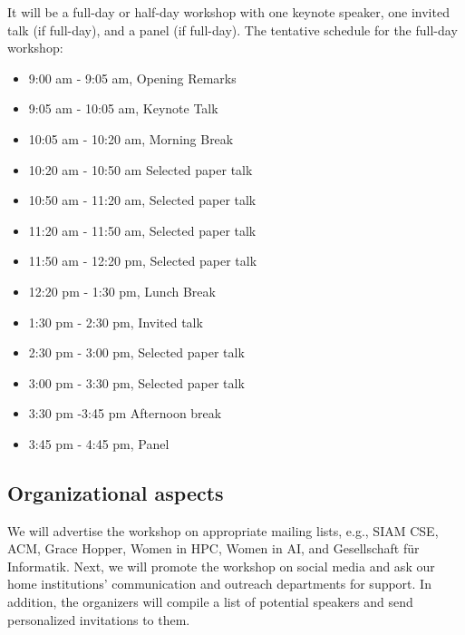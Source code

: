 \documentclass{article}
\begin{document}
It will be a full-day or half-day workshop with one keynote speaker, one invited talk (if full-day), and a panel (if full-day).
The tentative schedule for the full-day workshop:
\begin{itemize}
\item 9:00 am - 9:05 am, Opening Remarks
\item 9:05 am - 10:05 am, Keynote Talk  
\item 10:05 am - 10:20 am, Morning Break
\item 10:20 am - 10:50 am Selected paper talk
\item 10:50 am - 11:20 am, Selected paper talk
\item 11:20 am - 11:50 am, Selected paper talk
\item 11:50 am - 12:20 pm, Selected paper talk
\item 12:20 pm - 1:30 pm, Lunch Break 
\item 1:30 pm - 2:30 pm, Invited talk 
\item 2:30 pm - 3:00 pm, Selected paper talk
\item 3:00 pm - 3:30 pm, Selected paper talk
\item 3:30 pm -3:45 pm Afternoon break
\item 3:45 pm - 4:45 pm, Panel 
\end{itemize}

\subsection*{Organizational aspects}
We will advertise the workshop on appropriate mailing lists, e.g., SIAM CSE, ACM, Grace Hopper, Women in HPC, Women in AI, and Gesellschaft für Informatik. Next, we will promote the workshop on social media and ask our home institutions’ communication and outreach departments for support. In addition, the organizers will compile a list of potential speakers and send personalized invitations to them. 
\end{document}
